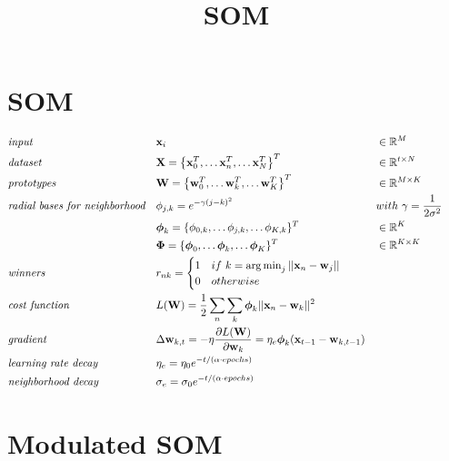\documentclass[a4paper]{article}
\title{SOM}
\author{}
\DeclareMathOperator*{\argmin}{\operatorname*{arg\,min}} %
\begin{document}
\maketitle

\section*{SOM}

\begin{align}
	&\emph{input} && \mathbf{x}_i &&\in\mathbb{R}^M \nonumber\\
	&\emph{dataset} && \mathbf{X}=\left\{\mathbf{x}^T_0,\dots\mathbf{x}^T_n,\dots\mathbf{x}^T_N\right\}^T &&\in\mathbb{R}^{t\times N} \nonumber\\
	&\emph{prototypes} && \mathbf{W}=\left\{\mathbf{w}^T_0,\dots\mathbf{w}^T_k,\dots\mathbf{w}^T_K\right\}^T &&\in\mathbb{R}^{M \times K} \nonumber\\
    &\emph{radial bases for neighborhood} && {\phi}_{j,k} = e^{{-\gamma (j-k)^2}} && with\ \gamma=\frac{1}{2\sigma^2}\nonumber\\
    &&& \boldsymbol{\phi}_k = \{\phi_{0,k}, \dots\phi_{j,k}, \dots \phi_{K,k}\}^T && \in\mathbb{R}^{K}\nonumber\\
    &&& \boldsymbol{\Phi} = \{\boldsymbol{\phi}_0, \dots\boldsymbol{\phi}_k, \dots \boldsymbol{\phi}_K\}^T && \in\mathbb{R}^{K\times K}\nonumber\\
    &\emph{winners}&&  r_{nk} = 
   \begin{cases}
    1  & if\ k = \argmin_j ||\mathbf{x}_n - \mathbf{w}_j||\\
    0  & otherwise
  \end{cases} &&\nonumber\\
 	&\emph{cost function} && L(\mathbf{W}) = \frac{1}{2}\sum_n\sum_k \boldsymbol{\phi}_{k}||\mathbf{x}_n - \mathbf{w}_k||^2 &&   &&\nonumber\\
    &\emph{gradient}&& \Delta{\mathbf{w}_{k,t}} = -\eta\frac{\partial L(\mathbf{W})}{\partial\mathbf{w}_k} = \eta_e\boldsymbol{\phi}_{k}(\mathbf{x}_{t-1} - \mathbf{w}_{k, t-1}) &&\nonumber\\
    &\emph{learning rate decay}&&  \eta_e = \eta_0e^{-t/(\alpha\cdot epochs)} &&\nonumber\\
    &\emph{neighborhood decay}&&  \sigma_e = \sigma_0e^{-t/(\alpha\cdot epochs)} &&\nonumber   
\end{align}

\section*{Modulated SOM}
\end{document}
